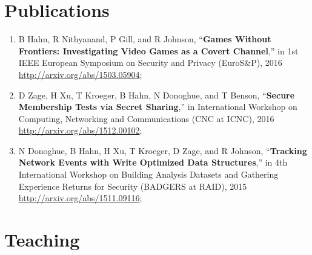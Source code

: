 \documentclass[11pt,a4paper,sans]{moderncv}        %
\begin{document}
\section{Publications}
\begin{enumerate}
	\item  B Hahn, R Nithyanand, P Gill, and R Johnson, “\textbf{Games Without Frontiers: Investigating Video Games as a Covert Channel},” in 1st IEEE European Symposium on Security and Privacy (EuroS\&P), 2016 \\ \url{http://arxiv.org/abs/1503.05904};
	\item D Zage, H Xu, T Kroeger, B Hahn, N Donoghue, and T Benson, “\textbf{Secure Membership Tests via Secret Sharing},” in International Workshop on Computing, Networking and Communications (CNC at ICNC), 2016 \\
	\url{http://arxiv.org/abs/1512.00102};
	\item N Donoghue, B Hahn, H Xu, T Kroeger, D Zage, and R Johnson, “\textbf{Tracking Network Events with Write Optimized Data Structures},” in 4th International Workshop on Building Analysis Datasets and Gathering Experience Returns for Security (BADGERS at RAID), 2015\\
	\url{http://arxiv.org/abs/1511.09116};
\end{enumerate}

\section{Teaching}
\end{document}

